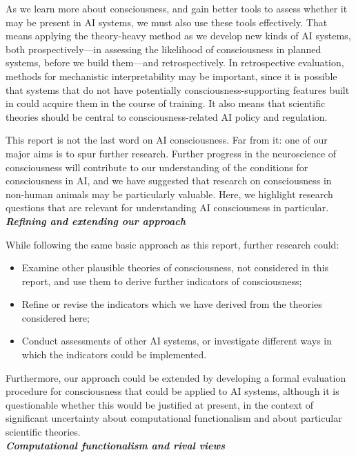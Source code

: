 \documentclass[12pt]{article}
\newcommand{\infopar}{\\[5pt]}
\begin{document}
As we learn more about consciousness, and gain better tools to assess whether it may be present in AI systems, we must also use these tools effectively. That means applying the theory-heavy method as we develop new kinds of AI systems, both prospectively—in assessing the likelihood of consciousness in planned systems, before we build them—and retrospectively. In retrospective evaluation, methods for mechanistic interpretability may be important, since it is possible that systems that do not have potentially consciousness-supporting features built in could acquire them in the course of training. It also means that scientific theories should be central to consciousness-related AI policy and regulation.

\begin{infobox} 

This report is not the last word on AI consciousness. Far from it: one of our major aims is to spur further research. Further progress in the neuroscience of consciousness will contribute to our understanding of the conditions for consciousness in AI, and we have suggested that research on consciousness in non-human animals may be particularly valuable. Here, we highlight research questions that are relevant for understanding AI consciousness in particular.
\infopar
\textbf{\textit{Refining and extending our approach}}

While following the same basic approach as this report, further research could:

\begin{itemize}
    \item Examine other plausible theories of consciousness, not considered in this report, and use them to derive further indicators of consciousness;
    \item Refine or revise the indicators which we have derived from the theories considered here;
    \item Conduct assessments of other AI systems, or investigate different ways in which the indicators could be implemented.
\end{itemize}

Furthermore, our approach could be extended by developing a formal evaluation procedure for consciousness that could be applied to AI systems, although it is questionable whether this would be justified at present, in the context of significant uncertainty about computational functionalism and about particular scientific theories.
\infopar
\textbf{\textit{Computational functionalism and rival views}}


\end{infobox}
\end{document}
